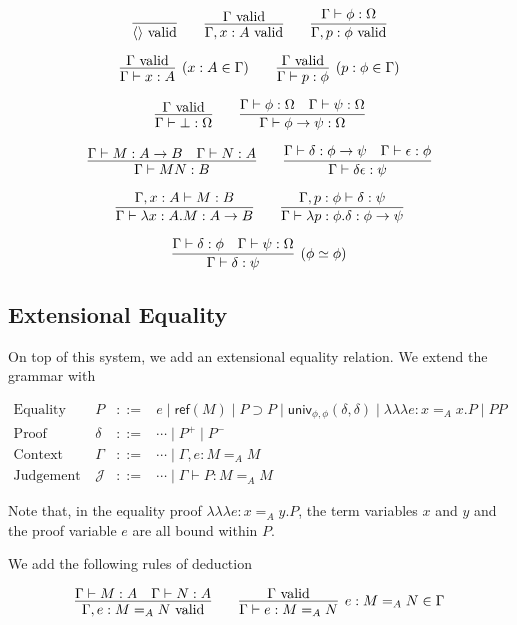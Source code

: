 \documentclass{easychair}
\newcommand{\vald}{\ \mathrm{valid}}
\newcommand{\univ}[4]{\mathsf{univ}_{{#1},{#2}} \left( {#3} , {#4} \right)}
\newcommand{\triplelambda}{\lambda \!\! \lambda \!\! \lambda}
\newcommand{\reff}[1]{\mathsf{ref} \left( {#1} \right)}
\begin{document}
\[ \infer{\langle \rangle \vald}{} \qquad
\infer{\Gamma, x : A \vald}{\Gamma \vald} \qquad 
\infer{\Gamma, p : \phi \vald}{\Gamma \vdash \phi : \Omega} \]

\[ \infer[(x : A \in \Gamma)]{\Gamma \vdash x : A}{\Gamma \vald} \qquad
\infer[(p : \phi \in \Gamma)]{\Gamma \vdash p : \phi}{\Gamma \vald} \]

\[ \infer{\Gamma \vdash \bot : \Omega}{\Gamma \vald} \qquad
\infer{\Gamma \vdash \phi \rightarrow \psi : \Omega}{\Gamma \vdash \phi : \Omega \quad \Gamma \vdash \psi : \Omega} \]

\[ \infer{\Gamma \vdash M N : B} {\Gamma \vdash M : A \rightarrow B \quad \Gamma \vdash N : A} \qquad
\infer{\Gamma \vdash \delta \epsilon : \psi} {\Gamma \vdash \delta : \phi \rightarrow \psi \quad \Gamma \vdash \epsilon : \phi} \]

\[ \infer{\Gamma \vdash \lambda x:A.M : A \rightarrow B}{\Gamma, x : A \vdash M : B} \qquad
\infer{\Gamma \vdash \lambda p : \phi . \delta : \phi \rightarrow \psi}{\Gamma, p : \phi \vdash \delta : \psi} \]

\[ \infer[(\phi \simeq \phi)]{\Gamma \vdash \delta : \psi}{\Gamma \vdash \delta : \phi \quad \Gamma \vdash \psi : \Omega} \]

\subsection{Extensional Equality}

On top of this system, we add an extensional equality relation.  We extend the grammar with

\[
\begin{array}{lrcl}
\text{Equality Proof} & P & ::= & e \mid \reff{M} \mid P \supset P \mid \univ{\phi}{\phi}{\delta}{\delta} \mid \triplelambda e : x =_A x . P \mid P P\\
\text{Proof} & \delta & ::= & \cdots \mid P^+ \mid P^- \\
\text{Context} & \Gamma & ::= & \cdots \mid \Gamma, e : M =_A M \\
\text{Judgement} & \mathcal{J} & ::= & \cdots \mid \Gamma \vdash P : M =_A M
\end{array}
\]

Note that, in the equality proof $\triplelambda e : x =_A y . P$, the term variables $x$ and $y$ and the proof variable $e$ are all bound within $P$.

We add the following rules of deduction

\[ \infer{\Gamma, e : M =_A N \vald}{\Gamma \vdash M : A \quad \Gamma \vdash N : A}
\qquad
\infer[e : M =_A N \in \Gamma]{\Gamma \vdash e : M =_A N}{\Gamma \vald} \]
\end{document}
